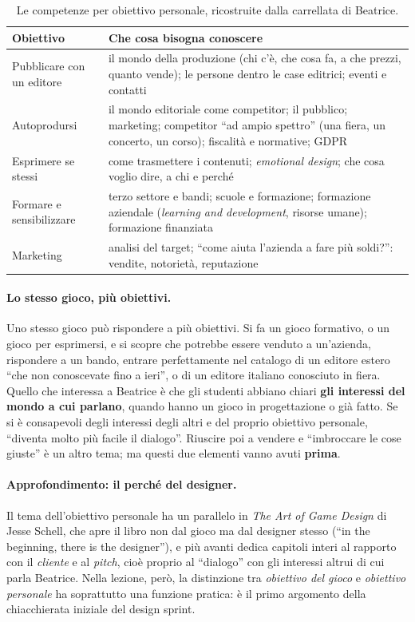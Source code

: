 \begin{table}[htbp]
\centering
\begin{tabular}{@{}p{3.0cm}p{9.6cm}@{}}
\toprule
\textbf{Obiettivo} & \textbf{Che cosa bisogna conoscere} \\
\midrule
Pubblicare con un editore & il mondo della produzione (chi c'è, che cosa fa, a che
prezzi, quanto vende); le persone dentro le case editrici; eventi e contatti \\
Autoprodursi & il mondo editoriale come competitor; il pubblico; marketing;
competitor ``ad ampio spettro'' (una fiera, un concerto, un corso); fiscalità e
normative; GDPR \\
Esprimere se stessi & come trasmettere i contenuti; \emph{emotional design}; che
cosa voglio dire, a chi e perché \\
Formare e sensibilizzare & terzo settore e bandi; scuole e formazione; formazione
aziendale (\emph{learning and development}, risorse umane); formazione finanziata \\
Marketing & analisi del target; ``come aiuta l'azienda a fare più soldi?'':
vendite, notorietà, reputazione \\
\bottomrule
\end{tabular}
\caption{Le competenze per obiettivo personale, ricostruite dalla carrellata di
Beatrice.}
\label{a7:tab:competenze}
\end{table}

\paragraph{Lo stesso gioco, più obiettivi.} Uno stesso gioco può rispondere a più
obiettivi. Si fa un gioco formativo, o un gioco per esprimersi, e si scopre che
potrebbe essere venduto a un'azienda, rispondere a un bando, entrare
perfettamente nel catalogo di un editore estero ``che non conoscevate fino a ieri'',
o di un editore italiano conosciuto in fiera. Quello che interessa a Beatrice è che
gli studenti abbiano chiari \textbf{gli interessi del mondo a cui parlano}, quando
hanno un gioco in progettazione o già fatto. Se si è consapevoli degli interessi
degli altri e del proprio obiettivo personale, ``diventa molto più facile il
dialogo''. Riuscire poi a vendere e ``imbroccare le cose giuste'' è un altro tema;
ma questi due elementi vanno avuti \textbf{prima}.

\paragraph{Approfondimento: il perché del designer.} Il tema dell'obiettivo personale
ha un parallelo in \emph{The Art of Game Design} di Jesse Schell, che apre il libro
non dal gioco ma dal designer stesso (``in the beginning, there is the designer''),
e più avanti dedica capitoli interi al rapporto con il \emph{cliente} e al
\emph{pitch}, cioè proprio al ``dialogo'' con gli interessi altrui di cui parla
Beatrice. Nella lezione, però, la distinzione tra
\emph{obiettivo del gioco} e \emph{obiettivo personale} ha soprattutto una funzione
pratica: è il primo argomento della chiacchierata iniziale del design sprint.

